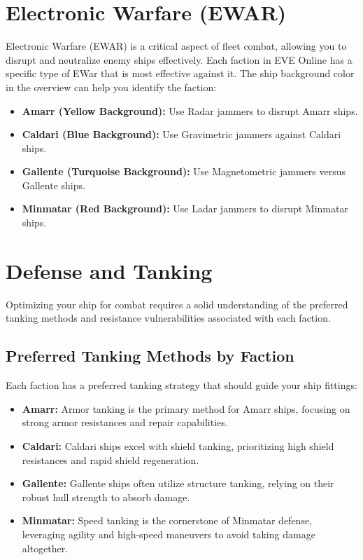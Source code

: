 \documentclass[a4paper,12pt]{article}
\begin{document}
\section{Electronic Warfare (EWAR)}

Electronic Warfare (EWAR) is a critical aspect of fleet combat, allowing you to disrupt and neutralize enemy ships effectively. Each faction in EVE Online has a specific type of EWar that is most effective against it. The ship background color in the overview can help you identify the faction:
\begin{itemize}
    \item \textbf{Amarr (Yellow Background):} Use Radar jammers to disrupt Amarr ships.
    \item \textbf{Caldari (Blue Background):} Use Gravimetric jammers against Caldari ships.
    \item \textbf{Gallente (Turquoise Background):} Use Magnetometric jammers versus Gallente ships.
    \item \textbf{Minmatar (Red Background):} Use Ladar jammers to disrupt Minmatar ships.
\end{itemize}

\section{Defense and Tanking}

Optimizing your ship for combat requires a solid understanding of the preferred tanking methods and resistance vulnerabilities associated with each faction.

\subsection{Preferred Tanking Methods by Faction}

Each faction has a preferred tanking strategy that should guide your ship fittings:

\begin{itemize}
    \item \textbf{Amarr:} Armor tanking is the primary method for Amarr ships, focusing on strong armor resistances and repair capabilities.
    \item \textbf{Caldari:} Caldari ships excel with shield tanking, prioritizing high shield resistances and rapid shield regeneration.
    \item \textbf{Gallente:} Gallente ships often utilize structure tanking, relying on their robust hull strength to absorb damage.
    \item \textbf{Minmatar:} Speed tanking is the cornerstone of Minmatar defense, leveraging agility and high-speed maneuvers to avoid taking damage altogether.
\end{itemize}
\end{document}
